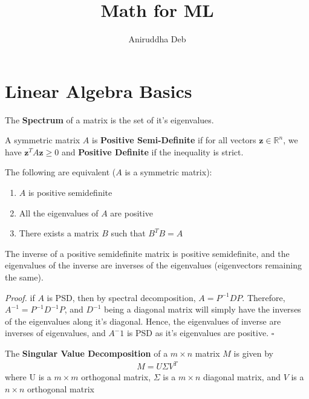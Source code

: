 \documentclass[a4paper]{article}
\title{\textbf{Math for ML}}
\author{Aniruddha Deb}
\date{}
\newenvironment{proof}{\begin{breakbox}\textit{Proof.}}{\hfill$\square$\end{breakbox}}
\newcommand{\mb}{\mathbb}
\begin{document}
\maketitle
\tableofcontents

\pagebreak

\section{Linear Algebra Basics}

\begin{defn}
  The \textbf{Spectrum} of a matrix is the set of it's eigenvalues. 
\end{defn}

\begin{defn}
  A symmetric matrix $A$ is \textbf{Positive Semi-Definite} if for all vectors $\bm{z} \in \mb{R}^n$, we have $\bm{z}^TA\bm{z} \ge 0$ and \textbf{Positive Definite} if the inequality is strict.
\end{defn}

\begin{theorem}
  The following are equivalent ($A$ is a symmetric matrix):
  \begin{enumerate}
    \item $A$ is positive semidefinite
    \item All the eigenvalues of $A$ are positive
    \item There exists a matrix $B$ such that $B^TB = A$
  \end{enumerate}
\end{theorem}

\begin{theorem}
  The inverse of a positive semidefinite matrix is positive semidefinite, and the eigenvalues of the inverse are inverses of the eigenvalues (eigenvectors remaining the same).
\end{theorem}

\begin{proof}
  if $A$ is PSD, then by spectral decomposition, $A = P^{-1}DP$. Therefore, $A^{-1} = P^{-1}D^{-1}P$, and $D^{-1}$ being a diagonal matrix will simply have the inverses of the eigenvalues along it's diagonal. Hence, the eigenvalues of inverse are inverses of eigenvalues, and $A^-1$ is PSD as it's eigenvalues are positive.
\end{proof}

\begin{defn}
The \textbf{Singular Value Decomposition} of a $m \times n$ matrix $M$ is given by 
\begin{align}
M = U \Sigma V^T
\end{align}
where U is a $m \times m$ orthogonal matrix, $\Sigma$ is a $m \times n$ diagonal matrix, and $V$ is a $n \times n$ orthogonal matrix
\end{defn}
\end{document}
